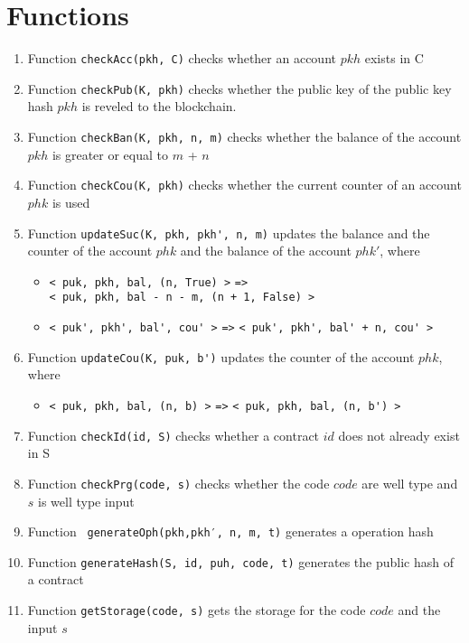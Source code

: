 \documentclass[a4paper]{llncs}
\begin{document}
\section{Functions}
\begin{enumerate}
    \item Function \verb!checkAcc(pkh, C)! checks whether an account $pkh$ exists in C
    \item Function \verb!checkPub(K, pkh)! checks whether the public key of the public key hash $pkh$ is reveled to the blockchain.
    \item Function \verb!checkBan(K, pkh, n, m)! checks whether the balance of the account $pkh$ is greater or equal to $m$ + $n$
    \item Function \verb!checkCou(K, pkh)! checks whether the current counter of an account $phk$ is used
    \item Function \verb!updateSuc(K, pkh, pkh', n, m)! updates the balance and the counter of the account $phk$ and the balance of the account $phk'$, where
    \begin{itemize}
        \item  \verb!< puk, pkh, bal, (n, True) >!  \verb!=>! \\ \verb!< puk, pkh, bal - n - m, (n + 1, False) >!
        \item  \verb!< puk', pkh', bal', cou' >! \verb!=>! \verb!< puk', pkh', bal' + n, cou' >!
    \end{itemize}
    
    \item Function \verb!updateCou(K, puk, b')! updates the counter of the account $phk$, where
    \begin{itemize}
        \item  \verb!< puk, pkh, bal, (n, b) >!  \verb!=>! \verb!< puk, pkh, bal, (n, b') >!
    \end{itemize}
    
    \item Function \verb!checkId(id, S)! checks whether a contract $id$ does not already exist in S
    
    \item Function \verb!checkPrg(code, s)! checks whether the code $code$ are well type and $s$ is well type input 
    
    
    \item Function \verb! generateOph(pkh,pkh′, n, m, t)! generates a operation hash

    \item Function \verb!generateHash(S, id, puh, code, t)! generates the public hash of a contract 
     
    \item Function \verb!getStorage(code, s)! gets the storage for the code $code$ and the input $s$
\end{enumerate}
\end{document}
